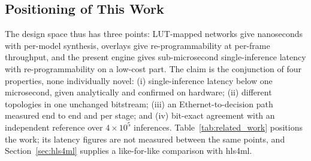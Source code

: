 \documentclass[final,5p,times,twocolumn]{elsarticle}
\begin{document}
\subsection{Positioning of This Work}
The design space thus has three points: LUT-mapped networks give nanoseconds
with per-model synthesis, overlays give re-programmability at per-frame
throughput, and the present engine gives sub-microsecond single-inference
latency with re-programmability on a low-cost part. The claim is the
conjunction of four properties, none individually novel: (i) single-inference
latency below one microsecond, given analytically and confirmed on hardware;
(ii) different topologies in one unchanged bitstream; (iii) an
Ethernet-to-decision path measured end to end and per stage; and (iv) bit-exact agreement
with an independent reference over $4\times10^{5}$ inferences.
Table~\ref{tab:related_work} positions the work; its latency figures are not
measured between the same points, and Section~\ref{sec:hls4ml} supplies a
like-for-like comparison with hls4ml.
\end{document}
